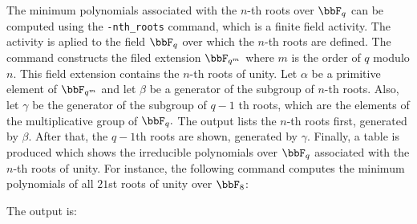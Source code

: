 \bigskip

The minimum polynomials associated with the $n$-th roots 
over $\bbF_q$ can be computed using the \verb'-nth_roots' command, which is a 
finite field activity. 
The activity is aplied to the field $\bbF_q$ over which the $n$-th roots are defined.
The command constructs the filed extension $\bbF_{q^m}$ where $m$ is the order of $q$ modulo $n$. 
This field extension contains the $n$-th roots of unity. 
Let $\alpha$ be a primitive element of $\bbF_{q^m}$ and let $\beta$ be a generator of the subgroup of $n$-th roots. 
Also, let $\gamma$ be the generator of the subgroup of $q-1$ th roots, which are the elements of the multiplicative group of $\bbF_q.$ 
The output lists the $n$-th roots first, generated by $\beta$. After that, the $q-1$th roots are shown, generated by $\gamma$. 
Finally, a table is produced which shows the irreducible polynomials over $\bbF_q$ associated with the $n$-th roots of unity.
For instance, the following command computes the minimum polynomials of all $21$st roots of unity over $\bbF_8$:
{\tt

}
The output is:

